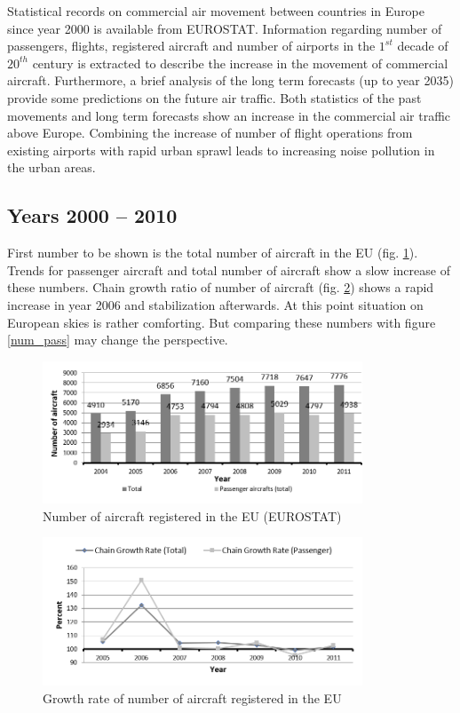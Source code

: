 Statistical records on commercial air movement between countries in Europe since year 2000 is available from EUROSTAT. Information regarding number of passengers, flights, registered aircraft and number of airports in the $1^{st}$ decade of $20^{th}$ century is extracted to describe the increase in the movement of commercial aircraft. Furthermore, a brief analysis of the long term forecasts (up to year 2035) provide some predictions on the future air traffic. Both statistics of the past movements and long term forecasts show an increase in the commercial air traffic above Europe. Combining the increase of number of flight operations from existing airports with rapid urban sprawl leads to increasing noise pollution in the urban areas.

\subsection{Years 2000 -- 2010}

First number to be shown is the total number of aircraft in the EU (fig. \ref{num_aircraft}). Trends for passenger aircraft and total number of aircraft show a slow increase of these numbers. Chain growth ratio of number of aircraft (fig. \ref{num_aircraft2}) shows a rapid increase in year 2006 and stabilization afterwards. At this point situation on European skies is rather comforting. But comparing these numbers with figure \ref{num_pass} may change the perspective.

\begin{figure}[h!]
\centering %
\includegraphics[width=0.85\textwidth]{Pictures/num_aircraft.png}
\caption{Number of aircraft registered in the EU (EUROSTAT)}
\label{num_aircraft}
\end{figure}

\begin{figure}[h!]
\centering %
\includegraphics[width=0.85\textwidth]{Pictures/num_aircraft2.png}
\caption{Growth rate of number of aircraft registered in the EU}
\label{num_aircraft2}
\end{figure}

